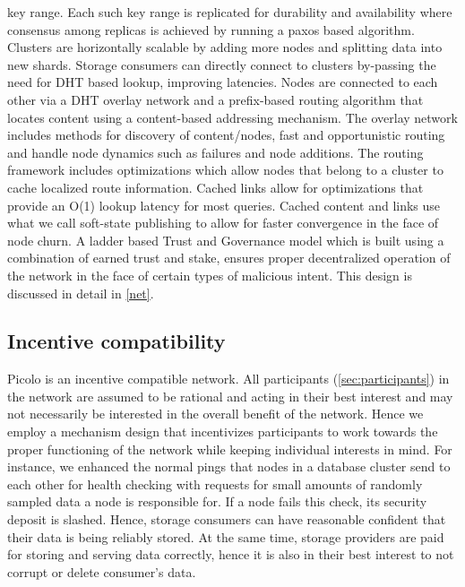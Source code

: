                                                                                                                                                                                                                                                                           {key range}. Each such key range is replicated for durability and availability where consensus among replicas is achieved by running a paxos based algorithm. Clusters are horizontally scalable by adding more nodes and splitting data into new shards. Storage consumers can directly connect to clusters by-passing the need for DHT based lookup, improving latencies.
\newline\newline
Nodes are connected to each other via a DHT overlay network and a prefix-based routing algorithm that locates content using a content-based addressing mechanism. The overlay network includes methods for discovery of
content/nodes, fast and opportunistic routing and handle node dynamics such as failures and node additions. The
routing framework includes optimizations which allow nodes that belong to a cluster to cache localized
route information. Cached links allow for optimizations that provide an O(1) lookup latency for most queries. Cached content and links use what we call soft-state publishing to allow for faster convergence in
the face of node churn. A ladder based Trust and Governance model which is built using a combination of earned trust
and stake, ensures proper decentralized operation of the network in the face of certain types of malicious intent. This
design is discussed in detail in \cref{net}.

\subsection{Incentive compatibility}
\textsf{Picolo} is an incentive compatible network. All participants (\cref{sec:participants}) in the network are assumed to be rational and acting in their best interest and may not necessarily be interested in the overall benefit of the network. Hence we employ a mechanism design that incentivizes participants to work towards the proper functioning of the network while keeping individual interests in mind. For instance, we enhanced the normal pings that nodes in a database cluster send to each other for health checking with requests for small amounts of randomly sampled data a node is responsible for. If a node fails this check, its security deposit is slashed. Hence, storage consumers can have reasonable confident that their data is being reliably stored. At the same time, storage providers are paid for storing and serving data correctly, hence it is also in their best interest to not corrupt or delete consumer's data.

